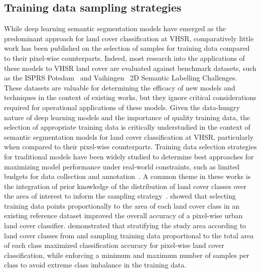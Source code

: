 
\subsection{Training data sampling strategies}

While deep learning semantic segmentation models have emerged as the predominant approach for land cover classification at VHSR, comparatively little work has been published on the selection of samples for training data compared to their pixel-wise counterparts.
Indeed, most research into the applications of these models to VHSR land cover are evaluated against benchmark datasets, such as the ISPRS Potsdam~\citep{2DSemanticLabeling} and Vaihingen~\citep{2DSemanticLabel} 2D Semantic Labelling Challenges.
These datasets are valuable for determining the efficacy of new models and techniques in the context of existing works, but they ignore critical considerations required for operational applications of these models.
Given the data-hungry nature of deep learning models and the importance of quality training data, the selection of appropriate training data is critically understudied in the context of semantic segmentation models for land cover classification at VHSR, particularly when compared to their pixel-wise counterparts.
Training data selection strategies for traditional models have been widely studied to determine best approaches for maximizing model performance under real-world constraints, such as limited budgets for data collection and annotation~\citep{millardImportanceTrainingData2015}.
A common theme in these works is the integration of prior knowledge of the distribution of land cover classes over the area of interest to inform the sampling strategy~\citep{canoImprovedForestcoverMapping2017, brownLessonsLearnedImplementing2020,dongStratifiedEvenSampling2020, zhouTrainingDataSelection2020}.
\citet{jinAssessingImpactTraining2014} showed that selecting training data points proportionally to the area of each land cover class in an existing reference dataset improved the overall accuracy of a pixel-wise urban land cover classifier.
\citet{zhuOptimizingSelectionTraining2016} demonstrated that stratifying the study area according to land cover classes from and sampling training data proportional to the total area of each class maximized classification accuracy for pixel-wise land cover classification, while enforcing a minimum and maximum number of samples per class to avoid extreme class imbalance in the training data.

